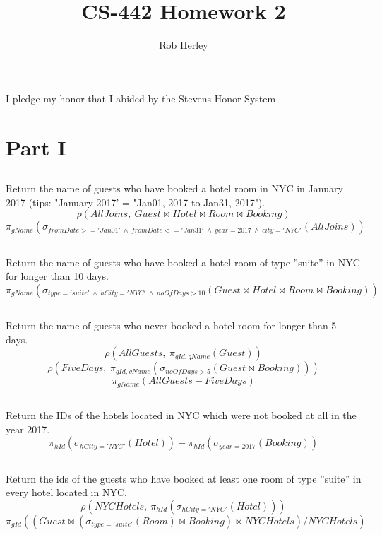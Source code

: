 \documentclass{article}
\begin{document}
\title{CS-442 Homework 2}
\author{Rob Herley}

\maketitle

\begin{center}
I pledge my honor that I abided by the Stevens Honor System
\end{center}

\section{Part I}
\subsection{}
Return the name of guests who have booked a hotel room in NYC in January 2017 (tips: "January 2017' = "Jan01, 2017 to Jan31, 2017").
$$\rho(AllJoins,\  Guest\bowtie Hotel\bowtie Room\bowtie Booking) $$
$$\pi _{ gName }(\sigma _{ fromDate>='Jan01'\  \wedge \  fromDate<='Jan31'\  \wedge \  year=2017\  \wedge \  city='NYC' }(AllJoins))$$

\subsection{}
Return the name of guests who have booked a hotel room of type ''suite'' in NYC for longer than 10 days.
$$\pi _{ gName }(\sigma _{ type='suite'\ \wedge \ hCity='NYC'\ \wedge \ noOfDays>10 }(Guest\bowtie Hotel\bowtie Room\bowtie Booking))$$

\subsection{}
Return the name of guests who never booked a hotel room for longer than 5 days.
$$\rho (AllGuests,\ \pi_{gId, gName}(Guest))$$
$$\rho (FiveDays,\ \pi_{gId, gName}(\sigma _{ noOfDays > 5 }(Guest \bowtie Booking)))$$
$$\pi_{gName}(AllGuests - FiveDays)$$

\subsection{}
Return the IDs of the hotels located in NYC which were not booked at all in the year 2017.
$$\pi_{hId}(\sigma_{hCity='NYC'}(Hotel))-\pi_{hId}(\sigma_{year=2017}(Booking))$$

\subsection{}
Return the ids of the guests who have booked at least one room of type ''suite'' in every hotel located in NYC.
$$\rho(NYCHotels, \ \pi_{hId}(\sigma_{hCity='NYC'}(Hotel)))$$
$$\pi_{gId}((Guest\bowtie(\sigma_{type='suite'}(Room)\bowtie Booking) \bowtie NYCHotels) / NYCHotels)$$
\end{document}
